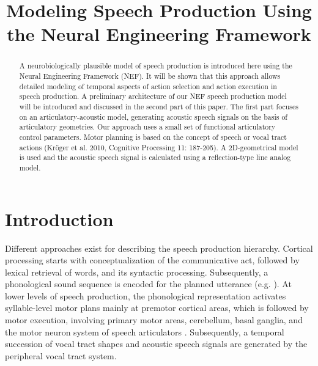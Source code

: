 \documentclass[conference]{IEEEtran}
\begin{document}
\title{Modeling Speech Production Using\\
  the Neural Engineering Framework}

\author{
\and
{}
}

\maketitle

\begin{abstract}
  A neurobiologically plausible model of speech production is
  introduced here using the Neural Engineering Framework (NEF).
  It will be shown that this approach allows
  detailed modeling of temporal aspects of action selection and action
  execution in speech production. A preliminary architecture of our
  NEF speech production model will be introduced and discussed in
  the second part of this paper. The first part focuses on an
  articulatory-acoustic model, generating acoustic speech signals on
  the basis of articulatory geometries. Our approach uses a small set
  of functional articulatory control parameters. Motor
  planning is based on the concept of speech or vocal tract actions
  (Kr\"{o}ger et al. 2010, Cognitive Processing 11: 187-205). A
  2D-geometrical model is used and the acoustic speech signal is
  calculated using a reflection-type line analog model.
\end{abstract}

\IEEEpeerreviewmaketitle

\section{Introduction}

Different approaches exist for describing the speech production
hierarchy. Cortical processing starts with conceptualization of the
communicative act, followed by lexical retrieval of words, and its
syntactic processing. Subsequently, a phonological sound sequence is
encoded for the planned utterance (e.g. \cite{levelt1999}). At lower
levels of speech production, the phonological representation activates
syllable-level motor plans mainly at premotor cortical areas, which is
followed by motor execution, involving primary motor areas,
cerebellum, basal ganglia, and the motor neuron system of
speech articulators \cite{riecker2005}. Subsequently, a temporal
succession of vocal tract shapes and acoustic speech signals are
generated by the peripheral vocal tract system.
\end{document}
